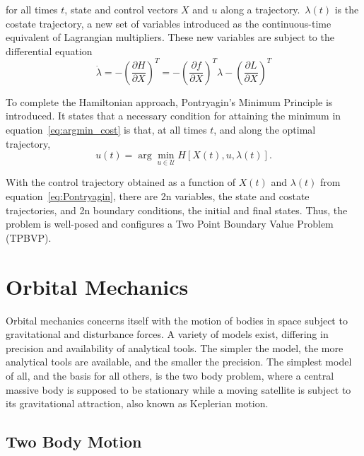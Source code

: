 for all times \(t\), state and control vectors \(X  \) and \(u\) along a trajectory.\ \( \lambda(t) \) is the costate trajectory, a new set of variables introduced as the continuous-time equivalent of Lagrangian multipliers. These new variables are subject to the differential equation
\begin{equation}
    \dot \lambda = - \left( \frac{\partial H}{\partial X} \right)^T = -\left( \frac{\partial f}{\partial X} \right)^T \lambda - \left( \frac{\partial L}{\partial X} \right)^T
\end{equation}

To complete the Hamiltonian approach, Pontryagin's Minimum Principle is introduced. It states that a necessary condition for attaining the minimum in equation~\eqref{eq:argmin_cost} is that, at all times \(t\), and along the optimal trajectory,
\begin{equation} \label{eq:Pontryagin}
    u(t) = \arg \min_{u \in \mathcal{U}} H[X(t), u, \lambda(t)].
\end{equation}

With the control trajectory obtained as a function of \(X(t)\) and \(\lambda(t)\) from equation~\eqref{eq:Pontryagin}, there are 2n variables, the state and costate trajectories, and 2n boundary conditions, the initial and final states. Thus, the problem is well-posed and configures a Two Point Boundary Value Problem (TPBVP).

\section{Orbital Mechanics}

Orbital mechanics concerns itself with the motion of bodies in space subject to gravitational and disturbance forces. A variety of models exist, differing in precision and availability of analytical tools. The simpler the model, the more analytical tools are available, and the smaller the precision. The simplest model of all, and the basis for all others, is the two body problem, where a central massive body is supposed to be stationary while a moving satellite is subject to its gravitational attraction, also known as Keplerian motion. 

\subsection{Two Body Motion}

